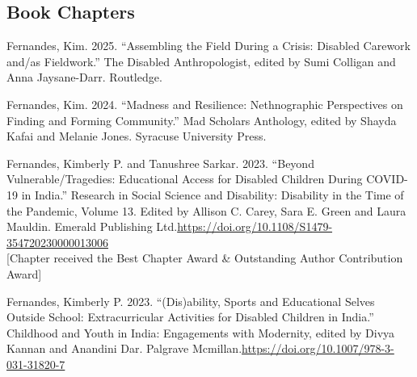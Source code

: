 \documentclass[11pt,letterpaper]{report}
\newcommand{\listitemspace}{0.25em}
\renewenvironment{itemize}{\begin{list}{}{\setlength{\leftmargin}{0em}\setlength{\parskip}{0em}\setlength{\itemsep}{\listitemspace}\setlength{\parsep}{\listitemspace}}}{\end{list}}
\begin{document}
    \subsection*{Book Chapters}
    \begin{itemize}
        \item Fernandes, Kim. 2025. “Assembling the Field During a Crisis: Disabled Carework and/as Fieldwork.” The Disabled Anthropologist, edited by Sumi Colligan and Anna Jaysane-Darr. Routledge.
        \item Fernandes, Kim. 2024. “Madness and Resilience: Nethnographic Perspectives on Finding and Forming Community.” Mad Scholars Anthology, edited by Shayda Kafai and Melanie Jones. Syracuse University Press.
        \item Fernandes, Kimberly P. and Tanushree Sarkar. 2023. “Beyond Vulnerable/Tragedies: Educational Access for Disabled Children During COVID-19 in India.” Research in Social Science and Disability: Disability in the Time of the Pandemic, Volume 13. Edited by Allison C. Carey, Sara E. Green and Laura Mauldin. Emerald Publishing Ltd.\newline\href{https://doi.org/10.1108/S1479-354720230000013006}{https://doi.org/10.1108/S1479-354720230000013006}\\[0.5\baselineskip]
[Chapter received the Best Chapter Award \& Outstanding Author Contribution Award]
        \item Fernandes, Kimberly P. 2023. “(Dis)ability, Sports and Educational Selves Outside School: Extracurricular Activities for Disabled Children in India.” Childhood and Youth in India: Engagements with Modernity, edited by Divya Kannan and Anandini Dar. Palgrave Mcmillan.\newline\href{https://doi.org/10.1007/978-3-031-31820-7}{https://doi.org/10.1007/978-3-031-31820-7}
    \end{itemize}
\end{document}
